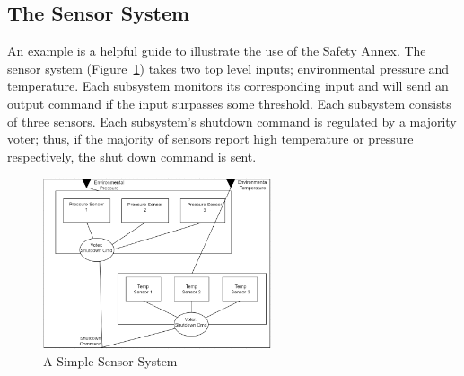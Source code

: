 \subsection{The Sensor System}
\label{sec:sensorExample}
An example is a helpful guide to illustrate the use of the Safety Annex. The sensor system (Figure~\ref{fig:sensorSys}) takes two top level inputs; environmental pressure and temperature. Each subsystem monitors its corresponding input and will send an output command if the input surpasses some threshold. Each subsystem consists of three sensors. Each subsystem's shutdown command is regulated by a majority voter; thus, if the majority of sensors report high temperature or pressure respectively, the shut down command is sent. 

\begin{figure}[h]
	\centering
	\includegraphics[width=0.6\textwidth]{images/two_sensors.PNG}
	\caption{A Simple Sensor System}
	\label{fig:sensorSys}
\end{figure}

